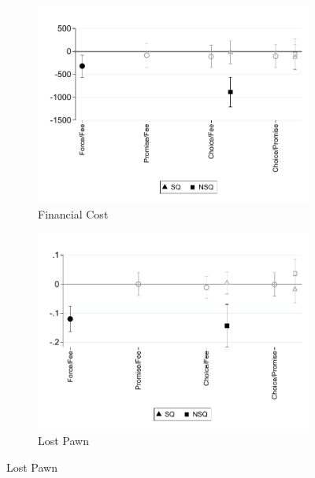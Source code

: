 \documentclass[oneside,11pt]{article}
\begin{document}
\begin{figure}[H]
    \caption{Treatment effects pooling all arms}
    \label{pooled_arms_te}
    \begin{center}
    \begin{subfigure}{0.45\textwidth}
        \caption{Financial Cost}
        \centering
        \includegraphics[width=\textwidth]{Figuras/te_allarms_fc_admin_disc.pdf}
    \end{subfigure}
    \begin{subfigure}{0.45\textwidth}
        \caption{Lost Pawn}
        \centering
        \includegraphics[width=\textwidth]{Figuras/te_allarms_def_c.pdf}
    \end{subfigure}
    \end{center}
     \scriptsize
\end{figure}
\end{document}

